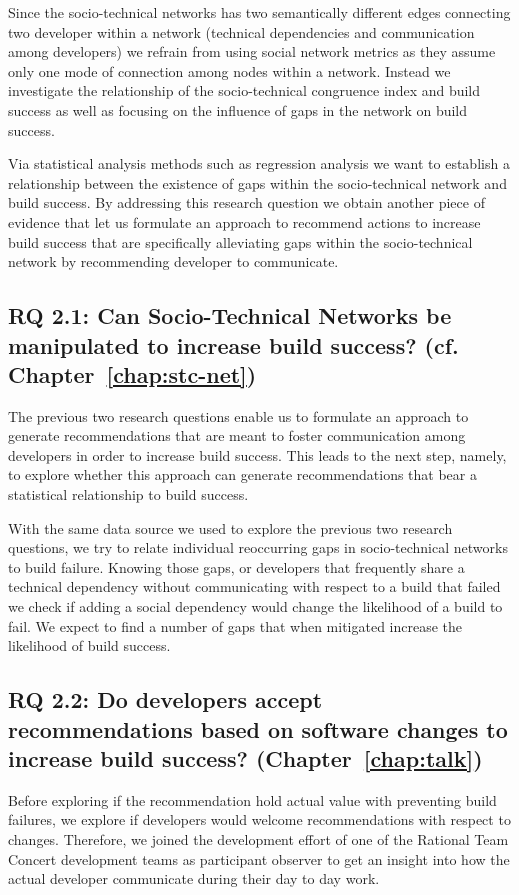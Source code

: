 Since the socio-technical networks has two semantically different edges connecting two developer within a network (technical dependencies and communication among developers) we refrain from using social network metrics as they assume only one mode of connection among nodes within a network.
Instead we investigate the relationship of the socio-technical congruence index and build success as well as focusing on the influence of gaps in the network on build success.

Via statistical analysis methods such as regression analysis we want to establish a relationship between the existence of gaps within the socio-technical network and build success.
By addressing this research question we obtain another piece of evidence that let us formulate an approach to recommend actions to increase build success that are specifically alleviating gaps within the socio-technical network by recommending developer to communicate.

\subsection{%
RQ 2.1: Can Socio-Technical Networks be manipulated to increase build success? (cf. Chapter~\ref{chap:stc-net})}
The previous two research questions enable us to formulate an approach to generate recommendations that are meant to foster communication among developers in order to increase build success.
This leads to the next step, namely, to explore whether this approach can generate recommendations that bear a statistical relationship to build success.

With the same data source we used to explore the previous two research questions, we try to relate individual reoccurring gaps in socio-technical networks to build failure.
Knowing those gaps, or developers that frequently share a technical dependency without communicating with respect to a build that failed we check if adding a social dependency would change the likelihood of a build to fail.
We expect to find a number of gaps that when mitigated increase the likelihood of build success.

\subsection{%
  RQ 2.2: Do developers accept recommendations based on software changes to increase build success? (Chapter~\ref{chap:talk})}
Before exploring if the recommendation hold actual value with preventing build failures, we explore if developers would welcome recommendations with respect to changes.
Therefore, we joined the development effort of one of the Rational Team Concert development teams as participant observer to get an insight into how the actual developer communicate during their day to day work.


